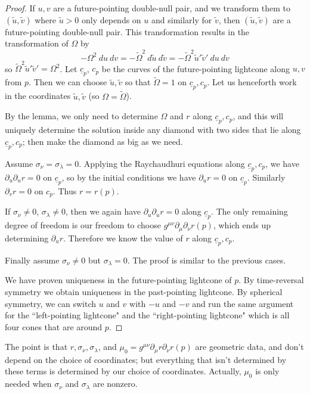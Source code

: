 \documentclass[12pt]{report}
\theoremstyle{definition}
\theoremstyle{remark}
\begin{document}
\begin{proof}
    If $u,v$ are a future-pointing double-null pair, and we transform them to $(\tilde u, \tilde v)$ where $\tilde u > 0$ only depends on $u$ and similarly for $\tilde v$, then $(\tilde u, \tilde v)$ are a future-pointing double-null pair. This transformation results in the transformation of $\Omega$ by
$$-\Omega^2 ~du~dv = -\tilde \Omega^2 ~d\tilde u ~d\tilde v = -\tilde \Omega^2 \tilde u' \tilde v' ~du ~dv$$
so $\tilde \Omega^2 \tilde u' \tilde v' = \Omega^2$.
    Let $\underline c_p$, $c_p$ be the curves of the future-pointing lightcone along $u, v$ from $p$. Then we can choose $\tilde u, \tilde v$ so that $\tilde \Omega = 1$ on $\underline c_p, c_p$. Let us henceforth work in the coordinates $\tilde u, \tilde v$ (so $\Omega = \tilde \Omega$).

    By the lemma, we only need to determine $\Omega$ and $r$ along $\underline c_p, c_p$, and this will uniquely determine the solution inside any diamond with two sides that lie along $\underline c_p, c_p$; then make the diamond as big as we need.
    
    Assume $\sigma_\nu = \sigma_\lambda = 0$. Applying the Raychaudhuri equations along $\underline c_p, c_p$, we have $\partial_u\partial_u r = 0$ on $\underline c_p$, so by the initial conditions we have $\partial_u r = 0$ on $\underline c_p$. Similarly $\partial_v r = 0$ on $c_p$. Thus $r = r(p)$.
    
    If $\sigma_\nu \neq 0$, $\sigma_\lambda \neq 0$, then we again have $\partial_u \partial_u r = 0$ along $\underline c_p$. The only remaining degree of freedom is our freedom to choose $g^{\mu\nu} \partial_\mu \partial_\nu r(p)$, which ends up determining $\partial_u r$. Therefore we know the value of $r$ along $\underline c_p, c_p$.
    
    Finally assume $\sigma_\nu \neq 0$ but $\sigma_\lambda = 0$. The proof is similar to the previous cases.
    
    We have proven uniqueness in the future-pointing lightcone of $p$. By time-reversal symmetry we obtain uniqueness in the past-pointing lightcone. By spherical symmetry, we can switch $u$ and $v$ with $-u$ and $-v$ and run the same argument for the ``left-pointing lightcone" and the ``right-pointing lightcone" which is all four cones that are around $p$.
\end{proof}
    The point is that $r,\sigma_\nu,\sigma_\lambda$, and $\mu_0 = g^{\mu\nu}\partial_\mu r \partial_\nu r(p)$ are geometric data, and don't depend on the choice of coordinates; but everything that isn't determined by these terms is determined by our choice of coordinates. Actually, $\mu_0$ is only needed when $\sigma_\nu$ and $\sigma_\lambda$ are nonzero.
\end{document}
